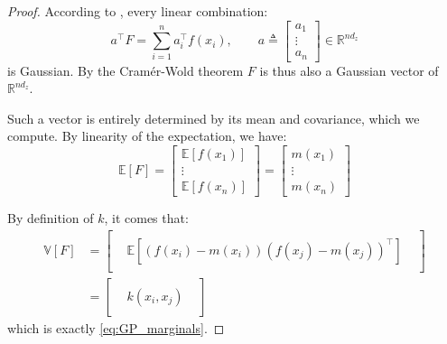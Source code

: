 \begin{proof}
	According to , every linear combination:
	\begin{equation}
		a^\top F=\sum_{i=1}^na_i^\top f(x_i),\qquad a\triangleq\begin{bmatrix}a_1\\\vdots\\a_n\end{bmatrix}\in\mathbb{R}^{nd_z}
	\end{equation}
	is Gaussian. By the Cramér-Wold theorem $F$ is thus also a Gaussian vector of $\mathbb{R}^{nd_z}$.

	Such a vector is entirely determined by its mean and covariance, which we compute. By linearity of the expectation, we have:
	\begin{equation}
		\mathbb{E}[F]=\begin{bmatrix}\mathbb{E}[f(x_1)]\\\vdots\\\mathbb{E}[f(x_n)]\end{bmatrix}=\begin{bmatrix}m(x_1)\\\vdots\\m(x_n)\end{bmatrix}
	\end{equation}

	By definition of $k$, it comes that:
	\begin{equation}
		\begin{aligned}
		\mathbb{V}[F]&=\begin{bmatrix}
		&&\\&\mathbb{E}\left[(f(x_i)-m(x_i))(f(x_j)-m(x_j))^\top\right]&\\&&
		\end{bmatrix}\\
		&=\begin{bmatrix}
		&&\\&k(x_i,x_j)&\\&&
		\end{bmatrix}
		\end{aligned}
	\end{equation}
	which is exactly \eqref{eq:GP_marginals}.
\end{proof}

